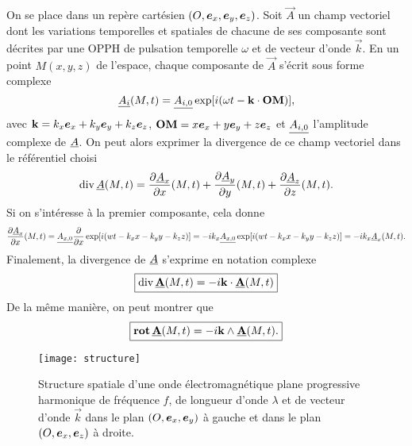 On se place dans un repère cartésien $(O, \ex, \ey, \ez)$.
Soit $\vec{A}$ un champ vectoriel dont les variations temporelles et spatiales de 
chacune de ses composante sont décrites par une OPPH de pulsation temporelle 
$\omega$ et de vecteur d'onde $\vec{k}$. En un point $M (x, y, z)$ de l'espace, 
chaque composante de
$\vec{A}$ s'écrit sous forme complexe
\begin{equation*}
	\underline{A_i}(M, t) = \underline{A_{i, 0}}\exp[i(\omega t - \mathbf{k} 
	\cdot \mathbf{OM})],
\end{equation*}
avec $\vec{k} = k_x\ex + k_y\ey + k_z\ez$, $\vec{OM} = x\ex + y\ey +z\ez$
et $\underline{A_{i, 0}}$ l'amplitude complexe de $\underline{A}$.
On peut alors exprimer la divergence de ce champ vectoriel dans le référentiel choisi
\begin{equation*}
	\mathrm{div}\, \underline{A}(M, t) = \dfrac{\partial \underline{A}_x}{\partial x}(M, t) + 
	\dfrac{\partial \underline{A}_y}{\partial y}(M, t) + \dfrac{\partial \underline{A}_z}{\partial z}(M, t).
\end{equation*}
Si on s'intéresse à la premier composante, cela donne
\begin{equation*}
	\dfrac{\partial \underline{A}_x}{\partial x}(M, t) = \underline{A_{x, 0}} \dfrac{\partial }{\partial x}
	\exp[i(wt - k_x x - k_y y -k_z z)] =
	-i k_x \underline{A_{x, 0}} 
	\exp[i(wt - k_x x - k_y y -k_z z)] = -i k_x \underline{A}_x(M, t).
\end{equation*}
Finalement, la divergence de $\underline{A}$ s'exprime en notation complexe
\begin{equation*}
	\boxed{
	\mathrm{div}\, \underline{\mathbf{A}}(M, t) = -i \mathbf{k} \cdot \underline{\mathbf{A}}(M,t)
}
\end{equation*}
De la même manière, on peut montrer que 
\begin{equation*}
	\boxed{
	\mathrm{\textbf{rot}}\, \underline{\mathbf{A}}(M, t) = -i \mathbf{k} \wedge \underline{\mathbf{A}}(M, t).
	}
\end{equation*}

\begin{figure}[b]
	\centering
	\texttt{[image: structure]}
	\caption{Structure spatiale d'une onde électromagnétique plane progressive
	harmonique de fréquence $f$, de longueur d'onde $\lambda$ et de vecteur d'onde 
$\vec{k}$ dans le plan $(O, \ex, \ey)$ à gauche et dans le plan $(O, \ex, \ez)$
à droite.}%
	\label{fig:maxwell_structure}
\end{figure}

